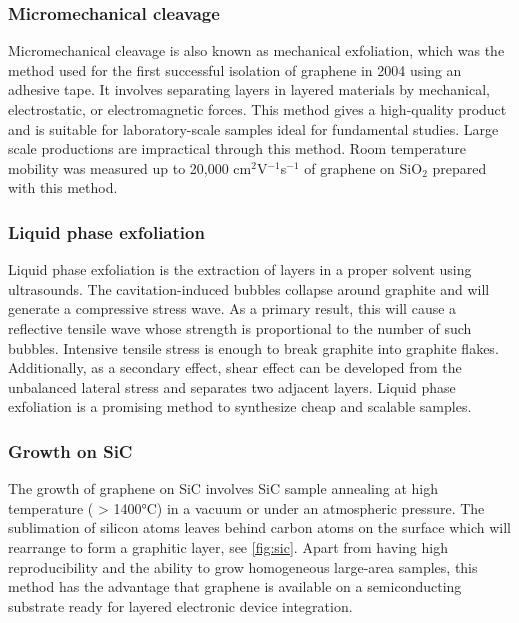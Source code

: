 \subsubsection{Micromechanical cleavage}

Micromechanical cleavage is also known as mechanical exfoliation, which was the method used for the first successful isolation of graphene in 2004 using an adhesive tape\cite{Novoselov26072005}. It involves separating layers in layered materials by mechanical, electrostatic, or electromagnetic forces. This method gives a high-quality product and is suitable for laboratory-scale samples ideal for fundamental studies. Large scale productions are impractical through this method.  Room temperature mobility was measured up to 20,000 cm$^2$V$^{-1}$s$^{-1}$\cite{Ni2010} of graphene on SiO$_2$ prepared with this method.

\subsubsection{Liquid phase exfoliation}

Liquid phase exfoliation is the extraction of layers in a proper solvent using ultrasounds. The cavitation-induced bubbles collapse around graphite and will generate a compressive stress wave. As a primary result, this will cause a reflective tensile wave whose strength is proportional to the number of such bubbles. Intensive tensile stress is enough to break graphite into graphite flakes. Additionally, as a secondary effect, shear effect can be developed from the unbalanced lateral stress and separates two adjacent layers. Liquid phase exfoliation is a promising method to synthesize cheap and scalable samples. 

\subsubsection{Growth on SiC}

The growth of graphene on SiC involves SiC sample annealing at high temperature ( > 1400\si{\celsius}) in a vacuum or under an atmospheric pressure. The sublimation of silicon atoms leaves behind carbon atoms on the surface which will rearrange to form a graphitic layer\cite{Mishra2016}, see \autoref{fig:sic}. Apart from having high reproducibility and the ability to grow homogeneous large-area samples, this method has the advantage that graphene is available on a semiconducting substrate ready for layered electronic device integration. 

